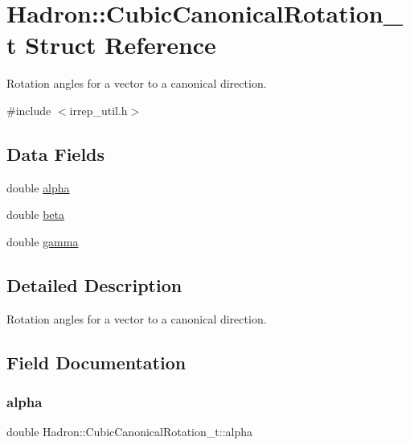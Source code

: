 \hypertarget{structHadron_1_1CubicCanonicalRotation__t}{}\section{Hadron\+:\+:Cubic\+Canonical\+Rotation\+\_\+t Struct Reference}
\label{structHadron_1_1CubicCanonicalRotation__t}


Rotation angles for a vector to a canonical direction.  




{\ttfamily \#include $<$irrep\+\_\+util.\+h$>$}

\subsection*{Data Fields}
\begin{DoxyCompactItemize}
\item 
double \mbox{\hyperlink{structHadron_1_1CubicCanonicalRotation__t_a0da30aa0d9b8ed232c9eb28f47e40a8a}{alpha}}
\item 
double \mbox{\hyperlink{structHadron_1_1CubicCanonicalRotation__t_ab83a3c8b939f4504a500f68550975fcb}{beta}}
\item 
double \mbox{\hyperlink{structHadron_1_1CubicCanonicalRotation__t_ae0064ce8b13dab53e29ef1dd2cae1e8b}{gamma}}
\end{DoxyCompactItemize}


\subsection{Detailed Description}
Rotation angles for a vector to a canonical direction. 

\subsection{Field Documentation}
\mbox{\label{structHadron_1_1CubicCanonicalRotation__t_a0da30aa0d9b8ed232c9eb28f47e40a8a}} 
\subsubsection{\texorpdfstring{alpha}{alpha}}
{\footnotesize\ttfamily double Hadron\+::\+Cubic\+Canonical\+Rotation\+\_\+t\+::alpha}

